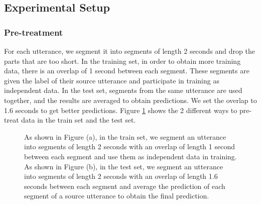 \documentclass[10pt, conference, compsocconf]{IEEEtran}
\begin{document}
 

\subsection{Experimental Setup}
\subsubsection{Pre-treatment}
For each utterance, we segment it into segments of length 2 seconds and drop the parts that are too short. In the training set, in order to obtain more training data, there is an overlap of 1 second between each segment. These segments are given the label of their source utterance and participate in training as independent data. In the test set, segments from the same utterance are used together, and the results are averaged to obtain predictions. We set the overlap to 1.6 seconds to get better predictions.
Figure \ref{pre-treat} shows the 2 different ways to pre-treat data in the train set and the test set.

\begin{figure}[h]
	
	\centering
	\subfigcapskip=5pt
	\caption{As shown in Figure (a), in the train set, we segment an utterance into segments of length 2 seconds with an overlap of length 1 second between each segment and use them as independent data in training. As shown in Figure (b), in the test set, we segment an utterance into segments of length 2 seconds with an overlap of length 1.6 seconds between each segment and average the prediction of each segment of a source utterance to obtain the final prediction.}
	\label{pre-treat}
	
\end{figure}
\end{document}
